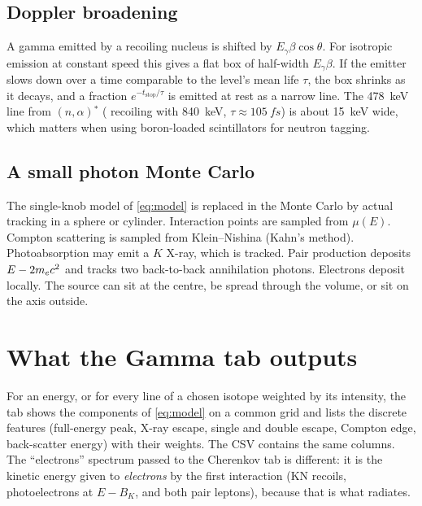 \subsection{Doppler broadening}
A gamma emitted by a recoiling nucleus is shifted by $E_\gamma\beta\cos\theta$. For isotropic emission at constant speed this gives a flat box of half-width $E_\gamma\beta$. If the emitter slows down over a time comparable to the level's mean life $\tau$, the box shrinks as it decays, and a fraction $e^{-t_\text{stop}/\tau}$ is emitted at rest as a narrow line. The \SI{478}{keV} line from $(n,\alpha)$$^*$ ( recoiling with \SI{840}{keV}, $\tau \approx \SI{105}{fs}$) is about \SI{15}{keV} wide, which matters when using boron-loaded scintillators for neutron tagging.

\subsection{A small photon Monte Carlo}
The single-knob model of \cref{eq:model} is replaced in the Monte Carlo by actual tracking in a sphere or cylinder. Interaction points are sampled from $\mu(E)$. Compton scattering is sampled from Klein--Nishina (Kahn's method). Photoabsorption may emit a $K$ X-ray, which is tracked. Pair production deposits $E - 2m_e c^2$ and tracks two back-to-back annihilation photons. Electrons deposit locally. The source can sit at the centre, be spread through the volume, or sit on the axis outside.
\section{What the Gamma tab outputs}
For an energy, or for every line of a chosen isotope weighted by its intensity, the tab shows the components of \cref{eq:model} on a common grid and lists the discrete features (full-energy peak, X-ray escape, single and double escape, Compton edge, back-scatter energy) with their weights. The CSV contains the same columns. The ``electrons'' spectrum passed to the Cherenkov tab is different: it is the kinetic energy given to \emph{electrons} by the first interaction (KN recoils, photoelectrons at $E - B_K$, and both pair leptons), because that is what radiates.

